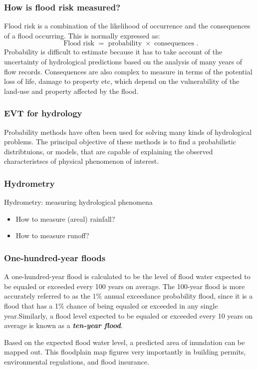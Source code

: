\documentclass[MAIN.tex]{subfiles}
\begin{document}
	\begin{frame}
		\frametitle{ How is flood risk measured?}
		Flood risk is a combination of the likelihood of occurrence and the consequences of a flood occurring. This is normally expressed as:
		\[ \mbox{ Flood risk } = \mbox{ probability } \times \mbox { consequences }.\]
		Probability is difficult to estimate because it has to take account of the uncertainty of hydrological predictions based on the analysis of many years of flow records. Consequences are also complex to measure in terms of the
		potential loss of life, damage to property etc, which depend on the vulnerability of the land-use and property affected by the flood.
		
		
		
	\end{frame}
	\begin{frame}
		\frametitle{EVT for hydrology}
		Probability methods have often been used for solving many kinds of hydrological problems. The principal objective of these methods is to find a probabilistic distribtuions, or models, that are capable of explaining the observed  characteristscs of physical phenomenon of interest.
		
	\end{frame}
	\begin{frame}
		\frametitle{Hydrometry}
		Hydrometry: measuring hydrological phenomena
		\begin{itemize}
			\item How to measure (areal) rainfall?
			\item How to measure runoff?
		\end{itemize}
	\end{frame}
	\begin{frame}
		
		
		\frametitle{One-hundred-year floods }
		A one-hundred-year flood is calculated to be the level of flood water expected to be equaled or exceeded every 100 years on average. The 100-year flood is more accurately referred to as the $1\%$ annual exceedance probability flood, since it is a flood that has a 1\% chance of being equaled or exceeded in any single
		year.Similarly, a flood level expected to be equaled or exceeded every 10 years on average is known as a \textbf{\emph{ten-year
				flood}}.
		
		Based on the expected flood water level, a predicted area of inundation can be mapped out. This floodplain map figures very
		importantly in building permits, environmental regulations, and flood insurance.
	\end{frame}
\end{document}
